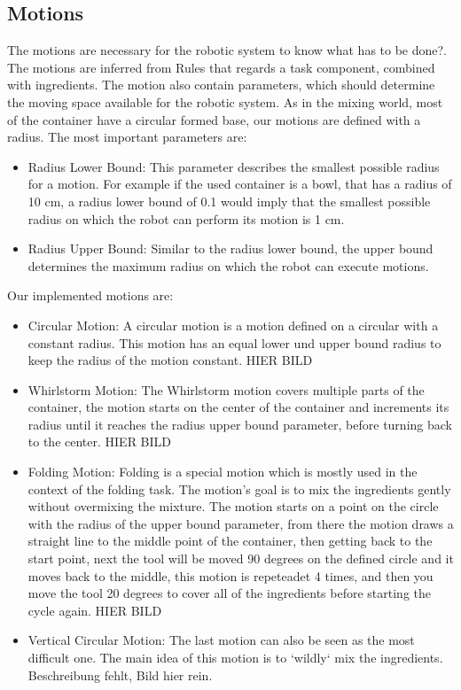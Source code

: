 \subsection{Motions}
The motions are necessary for the robotic system to know what has to be done?. The motions are inferred from Rules that regards a task component, combined with ingredients.
The motion also contain parameters, which should determine the moving space available for the robotic system. As in the mixing world, most of the container have a circular formed base, our motions are defined with a radius.
The most important parameters are:
\begin{itemize}
    \item Radius Lower Bound: This parameter describes the smallest possible radius for a motion. For example if the used container is a bowl, that has a radius of 10 cm, a radius lower bound of 0.1 would imply that the smallest possible radius on which the robot can perform its motion is 1 cm.
    \item Radius Upper Bound: Similar to the radius lower bound, the upper bound determines the maximum radius on which the robot can execute motions.
\end{itemize}
Our implemented motions are:
\begin{itemize}
    \item Circular Motion: A circular motion is a motion defined on a circular with a constant radius. This motion has an equal lower und upper bound radius to keep the radius of the motion constant.  \newline HIER BILD
    \item Whirlstorm Motion: The Whirlstorm motion covers multiple parts of the container, the motion starts on the center of the container and increments its radius until it reaches the radius upper bound parameter, before turning back to the center. \newline HIER BILD
    \item Folding Motion: Folding is a special motion which is mostly used in the context of the folding task. The motion's goal is to mix the ingredients gently without overmixing the mixture. The motion starts on a point on the circle with the radius of the upper bound parameter, from there the motion draws a straight line to the middle point of the container, then getting back to the start point, next the tool will be moved 90 degrees on the defined circle and it moves back to the middle, this motion is repeteadet 4 times, and then you move the tool 20 degrees to cover all of the ingredients before starting the cycle again. \newline HIER BILD
    \item Vertical Circular Motion: The last motion can also be seen as the most difficult one. The main idea of this motion is to `wildly` mix the ingredients. Beschreibung fehlt, Bild hier rein.
\end{itemize}

